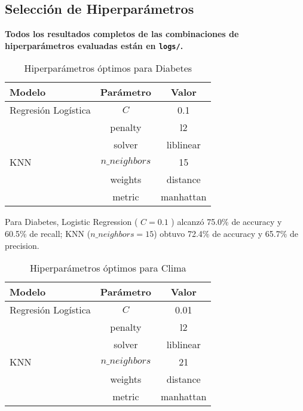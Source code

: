 \documentclass[journal]{IEEEtran}
\begin{document}
\subsection{Selección de Hiperparámetros}
\noindent\textbf{Todos los resultados completos de las combinaciones de hiperparámetros evaluadas están en \texttt{logs/}.}

\begin{table}[!htbp]
  \centering
  \caption{Hiperparámetros óptimos para Diabetes}
  \label{tab:hp_diabetes}
  \begin{tabular}{lcc}
    \toprule
    Modelo              & Parámetro       & Valor     \\
    \midrule
    Regresión Logística & \(C\)           & 0.1       \\
                        & penalty         & l2        \\
                        & solver          & liblinear \\
    \addlinespace
    KNN                 & \(n\_neighbors\)& 15        \\
                        & weights         & distance  \\
                        & metric          & manhattan \\
    \bottomrule
  \end{tabular}
\end{table}

\noindent
Para Diabetes, Logistic Regression ( \(C=0.1\) ) alcanzó 75.0\% de accuracy y 60.5\% de recall; KNN (\(n\_neighbors=15\)) obtuvo 72.4\% de accuracy y 65.7\% de precision.

\begin{table}[!htbp]
  \centering
  \caption{Hiperparámetros óptimos para Clima}
  \label{tab:hp_weather}
  \begin{tabular}{lcc}
    \toprule
    Modelo              & Parámetro       & Valor     \\
    \midrule
    Regresión Logística & \(C\)           & 0.01      \\
                        & penalty         & l2        \\
                        & solver          & liblinear \\
    \addlinespace
    KNN                 & \(n\_neighbors\)& 21        \\
                        & weights         & distance  \\
                        & metric          & manhattan \\
    \bottomrule
  \end{tabular}
\end{table}
\end{document}
